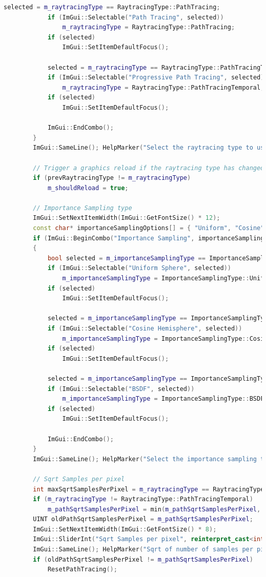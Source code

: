 \documentclass[12pt,a4paper]{report}
\numberwithin{equation}{section} %
\begin{document}
\begin{appendices}
\begin{lstlisting}[caption={Compunerea meniului ImGui},label={lst:showui},language=C++]
			selected = m_raytracingType == RaytracingType::PathTracing;
			if (ImGui::Selectable("Path Tracing", selected))
				m_raytracingType = RaytracingType::PathTracing;
			if (selected)
				ImGui::SetItemDefaultFocus();

			selected = m_raytracingType == RaytracingType::PathTracingTemporal;
			if (ImGui::Selectable("Progressive Path Tracing", selected))
				m_raytracingType = RaytracingType::PathTracingTemporal;
			if (selected)
				ImGui::SetItemDefaultFocus();

			ImGui::EndCombo();
		}
		ImGui::SameLine(); HelpMarker("Select the raytracing type to use");

		// Trigger a graphics reload if the raytracing type has changed.
		if (prevRaytracingType != m_raytracingType)
			m_shouldReload = true;

		// Importance Sampling type
		ImGui::SetNextItemWidth(ImGui::GetFontSize() * 12);
		const char* importanceSamplingOptions[] = { "Uniform", "Cosine", "BSDF" };
		if (ImGui::BeginCombo("Importance Sampling", importanceSamplingOptions[m_importanceSamplingType]))
		{
			bool selected = m_importanceSamplingType == ImportanceSamplingType::Uniform;
			if (ImGui::Selectable("Uniform Sphere", selected))
				m_importanceSamplingType = ImportanceSamplingType::Uniform;
			if (selected)
				ImGui::SetItemDefaultFocus();

			selected = m_importanceSamplingType == ImportanceSamplingType::Cosine;
			if (ImGui::Selectable("Cosine Hemisphere", selected))
				m_importanceSamplingType = ImportanceSamplingType::Cosine;
			if (selected)
				ImGui::SetItemDefaultFocus();

			selected = m_importanceSamplingType == ImportanceSamplingType::BSDF;
			if (ImGui::Selectable("BSDF", selected))
				m_importanceSamplingType = ImportanceSamplingType::BSDF;
			if (selected)
				ImGui::SetItemDefaultFocus();

			ImGui::EndCombo();
		}
		ImGui::SameLine(); HelpMarker("Select the importance sampling type to use");

		// Sqrt Samples per pixel
		int maxSqrtSamplesPerPixel = m_raytracingType == RaytracingType::PathTracingTemporal ? 16 : 4;
		if (m_raytracingType != RaytracingType::PathTracingTemporal)
			m_pathSqrtSamplesPerPixel = min(m_pathSqrtSamplesPerPixel, 4);
		UINT oldPathSqrtSamplesPerPixel = m_pathSqrtSamplesPerPixel;
		ImGui::SetNextItemWidth(ImGui::GetFontSize() * 8);
		ImGui::SliderInt("Sqrt Samples per pixel", reinterpret_cast<int*>(&m_pathSqrtSamplesPerPixel), 1, maxSqrtSamplesPerPixel);
		ImGui::SameLine(); HelpMarker("Sqrt of number of samples per pixel");
		if (oldPathSqrtSamplesPerPixel != m_pathSqrtSamplesPerPixel)
			ResetPathTracing();


\end{lstlisting}
\end{appendices}
\end{document}
